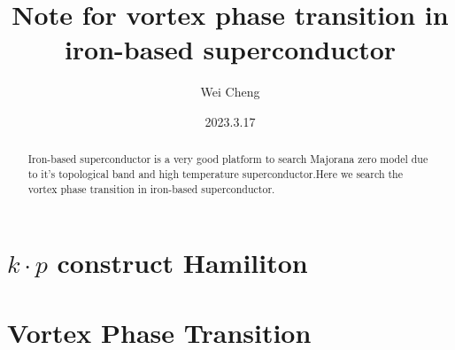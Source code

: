 \documentclass[5pt]{article}
\title{\LARGE {Note for vortex phase transition in iron-based superconductor}}
\author{\Large{Wei Cheng}}
\date{\Large{2023.3.17}}
\begin{document}
	\maketitle
	\Large
	\begin{abstract}
		\Large
		Iron-based superconductor is a very good platform to search Majorana zero model due to it's topological band and high temperature superconductor.Here we search the vortex phase transition in iron-based superconductor.
	\end{abstract}
\section*{$k\cdot p$ construct Hamiliton}








\section*{Vortex Phase Transition}
\end{document}
